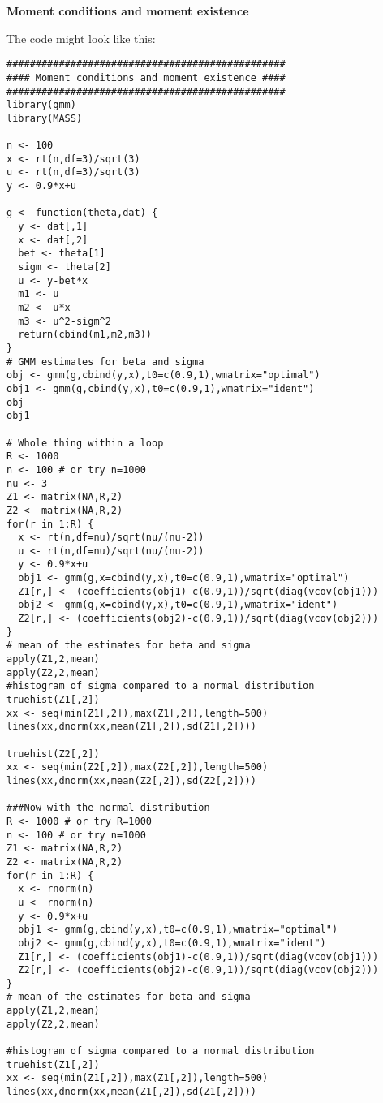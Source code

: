 \begin{Solution}{14.6}
\textbf{Moment conditions and moment existence }

The code might look like this:
\begin{verbatim}
################################################
#### Moment conditions and moment existence ####
################################################
library(gmm)
library(MASS)

n <- 100
x <- rt(n,df=3)/sqrt(3)
u <- rt(n,df=3)/sqrt(3)
y <- 0.9*x+u

g <- function(theta,dat) {
  y <- dat[,1]
  x <- dat[,2]
  bet <- theta[1]
  sigm <- theta[2]
  u <- y-bet*x
  m1 <- u
  m2 <- u*x
  m3 <- u^2-sigm^2
  return(cbind(m1,m2,m3))
}
# GMM estimates for beta and sigma
obj <- gmm(g,cbind(y,x),t0=c(0.9,1),wmatrix="optimal")
obj1 <- gmm(g,cbind(y,x),t0=c(0.9,1),wmatrix="ident")
obj
obj1

# Whole thing within a loop
R <- 1000
n <- 100 # or try n=1000
nu <- 3
Z1 <- matrix(NA,R,2)
Z2 <- matrix(NA,R,2)
for(r in 1:R) {
  x <- rt(n,df=nu)/sqrt(nu/(nu-2))
  u <- rt(n,df=nu)/sqrt(nu/(nu-2))
  y <- 0.9*x+u
  obj1 <- gmm(g,x=cbind(y,x),t0=c(0.9,1),wmatrix="optimal")
  Z1[r,] <- (coefficients(obj1)-c(0.9,1))/sqrt(diag(vcov(obj1)))
  obj2 <- gmm(g,x=cbind(y,x),t0=c(0.9,1),wmatrix="ident")
  Z2[r,] <- (coefficients(obj2)-c(0.9,1))/sqrt(diag(vcov(obj2)))
}
# mean of the estimates for beta and sigma
apply(Z1,2,mean)
apply(Z2,2,mean)
#histogram of sigma compared to a normal distribution
truehist(Z1[,2])
xx <- seq(min(Z1[,2]),max(Z1[,2]),length=500)
lines(xx,dnorm(xx,mean(Z1[,2]),sd(Z1[,2])))

truehist(Z2[,2])
xx <- seq(min(Z2[,2]),max(Z2[,2]),length=500)
lines(xx,dnorm(xx,mean(Z2[,2]),sd(Z2[,2])))

###Now with the normal distribution
R <- 1000 # or try R=1000
n <- 100 # or try n=1000
Z1 <- matrix(NA,R,2)
Z2 <- matrix(NA,R,2)
for(r in 1:R) {
  x <- rnorm(n)
  u <- rnorm(n)
  y <- 0.9*x+u
  obj1 <- gmm(g,cbind(y,x),t0=c(0.9,1),wmatrix="optimal")
  obj2 <- gmm(g,cbind(y,x),t0=c(0.9,1),wmatrix="ident")
  Z1[r,] <- (coefficients(obj1)-c(0.9,1))/sqrt(diag(vcov(obj1)))
  Z2[r,] <- (coefficients(obj2)-c(0.9,1))/sqrt(diag(vcov(obj2)))
}
# mean of the estimates for beta and sigma
apply(Z1,2,mean)
apply(Z2,2,mean)

#histogram of sigma compared to a normal distribution
truehist(Z1[,2])
xx <- seq(min(Z1[,2]),max(Z1[,2]),length=500)
lines(xx,dnorm(xx,mean(Z1[,2]),sd(Z1[,2])))


\end{verbatim}
\end{Solution}
